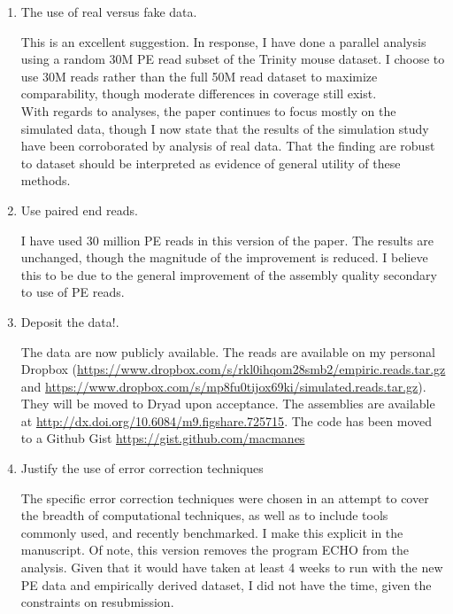 \documentclass[11pt]{article}
\begin{document}
\begin{enumerate}


\item The use of real versus fake data. 

\begin{addmargin}[2em]{2em}
This is an excellent suggestion. In response, I have done a parallel analysis using a random 30M PE read subset of the Trinity mouse dataset.  I choose to use 30M reads rather than the full 50M read dataset to maximize comparability, though moderate differences in coverage still exist.  \\

\noindent
With regards to analyses, the paper continues to focus mostly on the simulated data, though I now state that the results of the simulation study have been corroborated by analysis of real data.  That the finding are robust to dataset should be interpreted as evidence of general utility of these methods. 
\end{addmargin}

\item Use paired end reads.

\begin{addmargin}[2em]{2em}
I have used 30 million PE reads in this version of the paper. The results are unchanged, though the magnitude of the improvement is reduced. I believe this to be due to the general improvement of the assembly quality secondary to use of PE reads. 
\end{addmargin}

\item Deposit the data!. 
\begin{addmargin}[2em]{2em}
The data are now publicly available. The reads are available on my personal Dropbox (\url{https://www.dropbox.com/s/rkl0ihqom28smb2/empiric.reads.tar.gz} and \url{https://www.dropbox.com/s/mp8fu0tijox69ki/simulated.reads.tar.gz}). They will be moved to Dryad upon acceptance. The assemblies are available at \url{http://dx.doi.org/10.6084/m9.figshare.725715}. The code has been moved to a Github Gist \url{https://gist.github.com/macmanes}
\end{addmargin}


\item Justify the use of error correction techniques 
\begin{addmargin}[2em]{2em}
The specific error correction techniques were chosen in an attempt to cover the breadth of computational techniques, as well as to include tools commonly used, and recently benchmarked. I make this explicit in the manuscript. Of note, this version removes the program ECHO from the analysis. Given that it would have taken at least 4 weeks to run with the new PE data and empirically derived dataset, I did not have the time, given the constraints on resubmission. 
\end{addmargin}


\end{enumerate}
\end{document}
